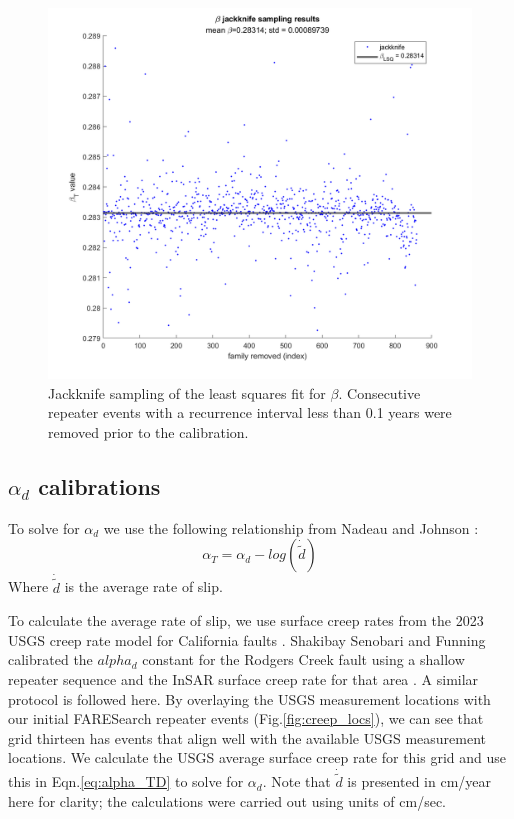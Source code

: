 \documentclass{article}
\begin{document}
\begin{figure}
\centering
\includegraphics[width=4.5in]{jackknife_results.png}
\caption{\label{fig:jackknife} Jackknife sampling of the least squares fit for $\beta$. Consecutive repeater events with a recurrence interval less than 0.1 years were removed prior to the calibration.}
\end{figure}

\subsection{$\alpha_d$ calibrations}
To solve for $\alpha_d$ we use the following relationship from Nadeau and Johnson \cite{nadeau98}:
\begin{equation}
    \alpha_T = \alpha_d - log(\dot{\tilde{d}})
    \label{eq:alpha_TD}
\end{equation}
Where $\dot{\tilde{d}}$ is the average rate of slip. 

To calculate the average rate of slip, we use surface creep rates from the 2023 USGS creep rate model for California faults \cite{johnson22}. Shakibay Senobari and Funning calibrated the $alpha_d$ constant for the Rodgers Creek fault using a shallow repeater sequence and the InSAR surface creep rate for that area \cite{shakibay19}. A similar protocol is followed here. By overlaying the USGS measurement locations with our initial FARESearch repeater events (Fig.\ref{fig:creep_locs}), we can see that grid thirteen has events that align well with the available USGS measurement locations. We calculate the USGS average surface creep rate for this grid and use this in Eqn.\ref{eq:alpha_TD} to solve for $\alpha_d$. Note that $\dot{\tilde{d}}$ is presented in cm/year here for clarity; the calculations were carried out using units of cm/sec.
\end{document}
